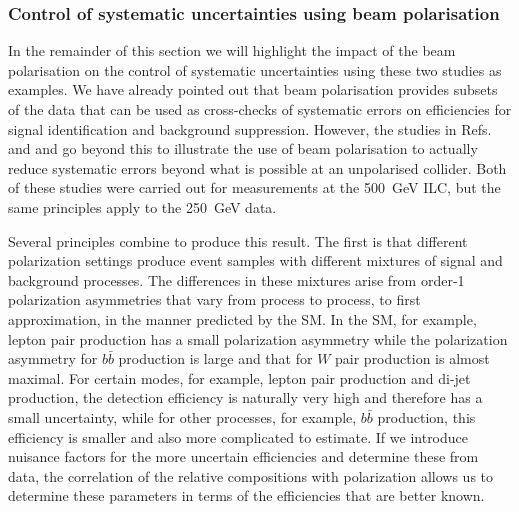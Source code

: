 \begin{itemize}


\end{itemize}



\subsubsection{Control of systematic uncertainties using beam polarisation} 
\label{subsubsec:pol:systematics}

In the remainder of this section we will highlight the impact of the beam polarisation on the control of systematic uncertainties using these two studies as examples.   We have already pointed out that beam polarisation provides subsets of the data that can be used as cross-checks of systematic errors on 
efficiencies for signal identification and background suppression.  However, the studies
in Refs.~ \cite{Habermehl:417605} and \cite{bib:PhDRobert} and go beyond this to illustrate the use of beam polarisation to actually reduce systematic errors beyond what is possible at 
an unpolarised collider.   Both of these studies were carried out for measurements at the 
500~GeV ILC, but the same principles apply to the 250~GeV data.

Several principles combine to produce this  result.   The first is that different polarization
settings produce event samples with different mixtures of signal and background 
processes.   The differences in these  mixtures arise from order-1 polarization asymmetries that vary from 
process to process, to first approximation, in the manner predicted by the SM.   In the SM, for example, lepton pair production has a small polarization asymmetry while the   polarization asymmetry for $b\bar b $ production is large and that for $W$ pair production is almost maximal.   For certain modes, for example, lepton pair production and di-jet production, the detection  efficiency is naturally very high and therefore has a small uncertainty, while for other processes, for example, $b\bar b$ production, this efficiency is smaller and also more complicated to estimate.  If we introduce nuisance factors for the more uncertain efficiencies
and determine these from data, the correlation of the relative compositions with polarization
allows us to determine these parameters in terms of the efficiencies that are better known. 

